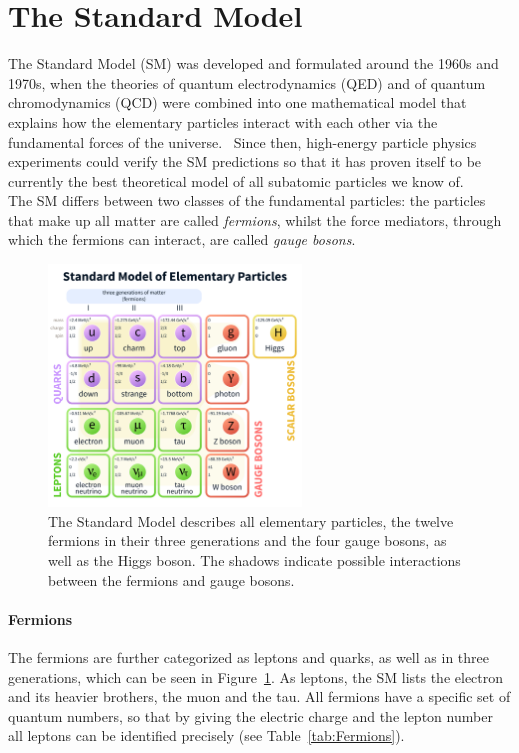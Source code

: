 \section{The Standard Model}
\label{StandardModel}
The Standard Model (SM) was developed and formulated around the 1960s and 1970s, when the theories of quantum electrodynamics (QED) and of quantum chromodynamics (QCD) were combined into one mathematical model that explains how the elementary particles interact with each other via the fundamental forces of the universe.~\cite[p. 3]{Griffiths}
Since then, high-energy particle physics experiments could verify the SM predictions so that it has proven itself to be currently the best theoretical model of all subatomic particles we know of.\\
The SM differs between two classes of the fundamental particles: 
the particles that make up all matter are called \textit{fermions}, whilst the force mediators, through which the fermions can interact, are called \textit{gauge bosons}.
\begin{figure}[h]
\centering
\includegraphics[width=0.6\textwidth]{Figures/Standard_Model_of_Elementary_Particles.png}
\caption[Standard Model]{The Standard Model describes all elementary particles, the twelve fermions in their three generations and the four gauge bosons, as well as the Higgs boson.
The shadows indicate possible interactions between the fermions and gauge bosons.~\cite{SM}}
\label{fig:SM}
\end{figure}

\paragraph{Fermions}
The fermions are further categorized as leptons and quarks, as well as in three generations, which can be seen in Figure~\ref{fig:SM}.
As leptons, the SM lists the electron and its heavier brothers, the muon and the tau.
All fermions have a specific set of quantum numbers, so that by giving the electric charge and the lepton number all leptons can be identified precisely (see Table~\ref{tab:Fermions}).

